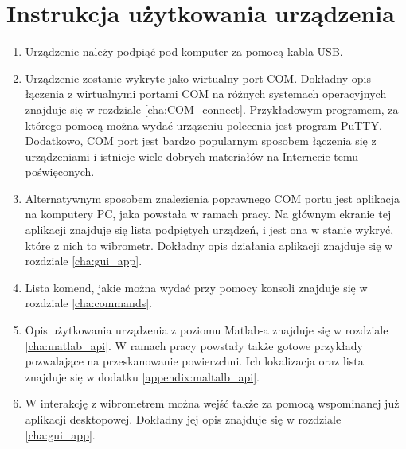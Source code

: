 \section{Instrukcja użytkowania urządzenia}
\begin{enumerate}
    \item Urządzenie należy podpiąć pod komputer za pomocą kabla USB.
    \item Urządzenie zostanie wykryte jako wirtualny port COM. Dokładny opis łączenia z wirtualnymi portami COM na różnych systemach operacyjnych znajduje się w rozdziale \ref{cha:COM_connect}. Przykładowym programem, za którego pomocą można wydać urzązeniu polecenia jest program \href{https://www.putty.org/}{PuTTY}. Dodatkowo, COM port jest bardzo popularnym sposobem łączenia się z urządzeniami i istnieje wiele dobrych materiałów na Internecie temu poświęconych.
    \item Alternatywnym sposobem znalezienia poprawnego COM portu jest aplikacja na komputery PC, jaka powstała w ramach pracy. Na głównym ekranie tej aplikacji znajduje się lista podpiętych urządzeń, i jest ona w stanie wykryć, które z nich to wibrometr. Dokładny opis działania aplikacji znajduje się w rozdziale \ref{cha:gui_app}.
    \item Lista komend, jakie można wydać przy pomocy konsoli znajduje się w rozdziale \ref{cha:commands}.
    \item Opis użytkowania urządzenia z poziomu Matlab-a znajduje się w rozdziale \ref{cha:matlab_api}. W ramach pracy powstały także gotowe przykłady pozwalające na przeskanowanie powierzchni. Ich lokalizacja oraz lista znajduje się w dodatku \ref{appendix:maltalb_api}.
    \item W interakcję z wibrometrem można wejść także za pomocą wspominanej już aplikacji desktopowej. Dokładny jej opis znajduje się w rozdziale \ref{cha:gui_app}.
\end{enumerate}